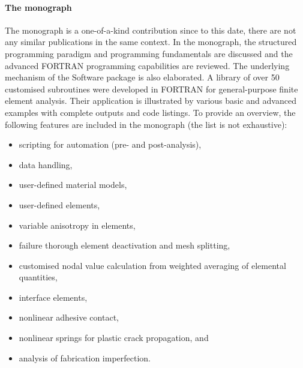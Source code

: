 	\paragraph{The monograph} The monograph is a one-of-a-kind contribution since to this date, there are not any similar publications in the same context. In the monograph, the structured programming paradigm and programming fundamentals are discussed and the advanced FORTRAN programming capabilities are reviewed. The underlying mechanism of the Software package is also elaborated. A library of over 50 customised subroutines were developed in FORTRAN for general-purpose finite element analysis. Their application is illustrated by various basic and advanced examples with complete outputs and code listings. To provide an overview, the following features are included in the monograph (the list is not exhaustive):
	\begin{itemize}
		\item scripting for automation (pre- and post-analysis), 
		\item data handling,
		\item user-defined material models, 
		\item user-defined elements,
		\item variable anisotropy in elements,
		\item failure thorough element deactivation and mesh splitting, 
		\item customised nodal value calculation from weighted averaging of elemental quantities,
		\item interface elements,
		\item nonlinear adhesive contact,
		\item nonlinear springs for plastic crack propagation, and
		\item analysis of fabrication imperfection.
	\end{itemize}
	